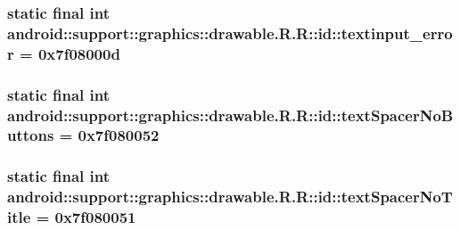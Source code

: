 \hypertarget{classandroid_1_1support_1_1graphics_1_1drawable_1_1_r_1_1id_2c0b1142ddd32cc4f083963a7078d06b}{
\subsubsection[{textinput\_\-error}]{\setlength{\rightskip}{0pt plus 5cm}static final int android::support::graphics::drawable.R.R::id::textinput\_\-error = 0x7f08000d}}
\label{classandroid_1_1support_1_1graphics_1_1drawable_1_1_r_1_1id_2c0b1142ddd32cc4f083963a7078d06b}


\hypertarget{classandroid_1_1support_1_1graphics_1_1drawable_1_1_r_1_1id_ac7294fce6d3068a79b76e761b94c33c}{
\subsubsection[{textSpacerNoButtons}]{\setlength{\rightskip}{0pt plus 5cm}static final int android::support::graphics::drawable.R.R::id::textSpacerNoButtons = 0x7f080052}}
\label{classandroid_1_1support_1_1graphics_1_1drawable_1_1_r_1_1id_ac7294fce6d3068a79b76e761b94c33c}


\hypertarget{classandroid_1_1support_1_1graphics_1_1drawable_1_1_r_1_1id_93888cc38a5b31a6caa56b284354d603}{
\subsubsection[{textSpacerNoTitle}]{\setlength{\rightskip}{0pt plus 5cm}static final int android::support::graphics::drawable.R.R::id::textSpacerNoTitle = 0x7f080051}}
\label{classandroid_1_1support_1_1graphics_1_1drawable_1_1_r_1_1id_93888cc38a5b31a6caa56b284354d603}


